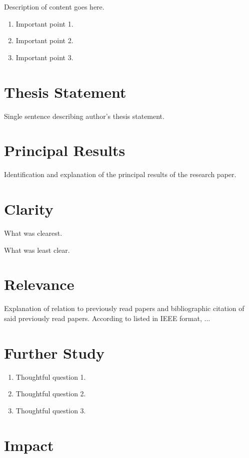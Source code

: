 \documentclass[12pt, letterpaper]{article}
\begin{document}
Description of content goes here.

\begin{enumerate}
    \item Important point 1.
    \item Important point 2.
    \item Important point 3.
\end{enumerate}

\section{Thesis Statement}
\label{sec:thesis}

Single sentence describing author's thesis statement.

\section{Principal Results}
\label{sec:principal}

Identification and explanation of the principal results of the research paper.

\section{Clarity}
\label{sec:clarity}

What was clearest.

What was least clear.

\section{Relevance}
\label{sec:relevance}

Explanation of relation to previously read papers and bibliographic citation of said previously read papers. According to \cite{sicp} listed in IEEE format, ...

\section{Further Study}
\label{sec:further}

\begin{enumerate}
    \item Thoughtful question 1.
    \item Thoughtful question 2.
    \item Thoughtful question 3.
\end{enumerate}

\section{Impact}
\label{sec:impact}
\end{document}
